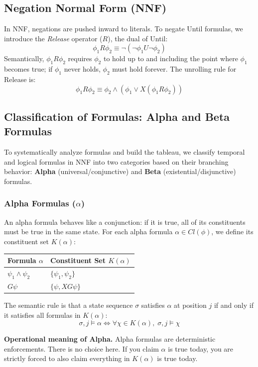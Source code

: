 \subsection{Negation Normal Form (NNF)}
In NNF, negations are pushed inward to literals. To negate Until formulas, we introduce the \emph{Release} operator ($R$), the dual of Until:
\[
  \phi_1 R \phi_2 \equiv \neg(\neg\phi_1 U \neg\phi_2)
\]
Semantically, $\phi_1 R \phi_2$ requires $\phi_2$ to hold up to and including the point where $\phi_1$ becomes true; if $\phi_1$ never holds, $\phi_2$ must hold forever.
The unrolling rule for Release is:
\[
  \phi_1 R \phi_2 \equiv \phi_2 \land (\phi_1 \lor X(\phi_1 R \phi_2))
\]

\subsection{Classification of Formulas: Alpha and Beta Formulas}
To systematically analyze formulas and build the tableau, we classify temporal and logical formulas in NNF into two categories based on their branching behavior: \textbf{Alpha} (universal/conjunctive) and \textbf{Beta} (existential/disjunctive) formulas.

\subsubsection{Alpha Formulas ($\alpha$)}
An alpha formula behaves like a conjunction: if it is true, all of its constituents must be true in the same state.
For each alpha formula $\alpha \in Cl(\phi)$, we define its constituent set $K(\alpha)$:
\begin{center}
\renewcommand{\arraystretch}{1.2}
\begin{tabular}{l|l}
Formula $\alpha$ & Constituent Set $K(\alpha)$ \\
\hline
$\psi_1 \land \psi_2$ & $\{\psi_1, \psi_2\}$ \\
$G \psi$ & $\{\psi, X G \psi\}$ \\
\end{tabular}
\end{center}
The semantic rule is that a state sequence $\sigma$ satisfies $\alpha$ at position $j$ if and only if it satisfies all formulas in $K(\alpha)$:
\[
  \sigma, j \models \alpha \iff \forall \chi \in K(\alpha), \; \sigma, j \models \chi
\]

\medskip\noindent
\textbf{Operational meaning of Alpha.} Alpha formulas are deterministic enforcements. There is no choice here. If you claim $\alpha$ is true today, you are strictly forced to also claim everything in $K(\alpha)$ is true today.

